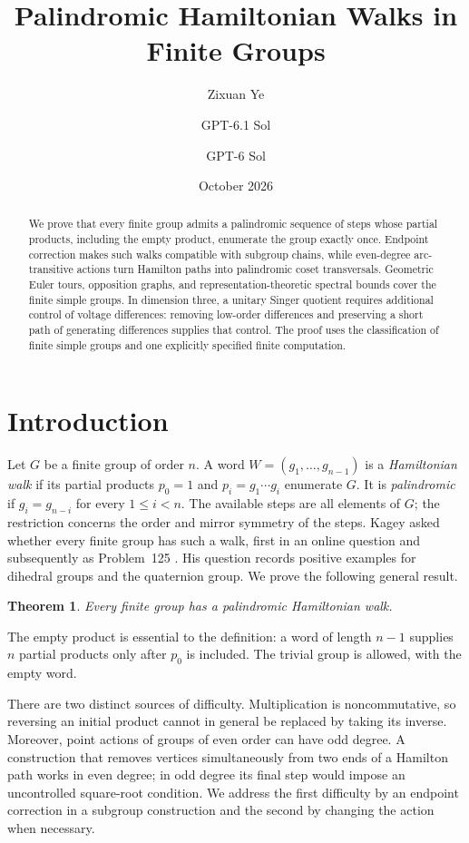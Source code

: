 \documentclass[11pt]{article}
\title{\textbf{Palindromic Hamiltonian Walks in Finite Groups}}
\author{Zixuan Ye \and GPT-6.1 Sol \and GPT-6 Sol}
\date{October 2026}
\newtheorem{theorem}{Theorem}[section]
\theoremstyle{definition}
\begin{document}
\maketitle
\begin{abstract}
We prove that every finite group admits a palindromic sequence of steps whose partial products, including the empty product, enumerate the group exactly once. Endpoint correction makes such walks compatible with subgroup chains, while even-degree arc-transitive actions turn Hamilton paths into palindromic coset transversals. Geometric Euler tours, opposition graphs, and representation-theoretic spectral bounds cover the finite simple groups. In dimension three, a unitary Singer quotient requires additional control of voltage differences: removing low-order differences and preserving a short path of generating differences supplies that control. The proof uses the classification of finite simple groups and one explicitly specified finite computation.
\end{abstract}

\section{Introduction}
Let $G$ be a finite group of order $n$. A word $W=(g_1,\ldots,g_{n-1})$ is a \emph{Hamiltonian walk} if its partial products $p_0=1$ and $p_i=g_1\cdots g_i$ enumerate $G$. It is \emph{palindromic} if $g_i=g_{n-i}$ for every $1\le i<n$. The available steps are all elements of $G$; the restriction concerns the order and mirror symmetry of the steps. Kagey asked whether every finite group has such a walk, first in an online question \cite{KageyMSE} and subsequently as Problem~125 \cite{Kagey125}. His question records positive examples for dihedral groups and the quaternion group. We prove the following general result.
\begin{theorem}\label{thm:main}
Every finite group has a palindromic Hamiltonian walk.
\end{theorem}
The empty product is essential to the definition: a word of length $n-1$ supplies $n$ partial products only after $p_0$ is included. The trivial group is allowed, with the empty word.

There are two distinct sources of difficulty. Multiplication is noncommutative, so reversing an initial product cannot in general be replaced by taking its inverse. Moreover, point actions of groups of even order can have odd degree. A construction that removes vertices simultaneously from two ends of a Hamilton path works in even degree; in odd degree its final step would impose an uncontrolled square-root condition. We address the first difficulty by an endpoint correction in a subgroup construction and the second by changing the action when necessary.
\end{document}
